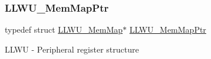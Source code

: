 \subsubsection{\texorpdfstring{L\+L\+W\+U\+\_\+\+Mem\+Map\+Ptr}{LLWU\_MemMapPtr}}
{\footnotesize\ttfamily typedef struct \hyperlink{struct_l_l_w_u___mem_map}{L\+L\+W\+U\+\_\+\+Mem\+Map}$\ast$ \hyperlink{group___l_l_w_u___peripheral_ga03cfefad45ecbfeb2cd16eb85ccfe186}{L\+L\+W\+U\+\_\+\+Mem\+Map\+Ptr}}

L\+L\+WU -\/ Peripheral register structure 